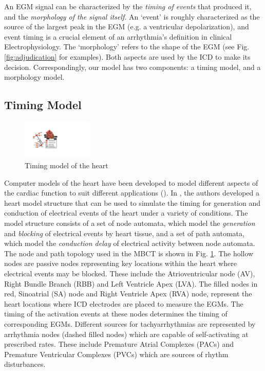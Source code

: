 An \ac{EGM} signal can be characterized by the \emph{timing of events} that produced it, and the \emph{morphology of the signal itself}.
An `event' is roughly characterized as the source of the largest peak in the \ac{EGM} (e.g. a ventricular depolarization), and event timing is a crucial element of an arrhythmia's definition in clinical Electrophysiology.
The `morphology' refers to the shape of the \ac{EGM} (see Fig. \ref{fig:adjudication} for examples).
Both aspects are used by the ICD to make its decision.
Correspondingly, our model has two components: a timing model, and a morphology model.

\subsection{Timing Model}
\begin{figure}[t]
	\centering
	\vspace{-10pt}
	\includegraphics[width=0.3\textwidth]{figs/HM_top.pdf}
	\caption{\small Timing model of the heart}
	\vspace{-10pt}
	\label{fig:HM_top}
\end{figure}
Computer models of the heart have been developed to model different aspects of the cardiac function to suit different applications (\cite{natalia}).
In \cite{VHM_proc}, the authors developed a heart model structure that can be used to simulate the timing for generation and conduction of electrical events of the heart under a variety of conditions.
The model structure consists of a set of node automata, which model the \emph{generation} and \emph{blocking} of electrical events by heart tissue, and a set of path automata, which model the \emph{conduction delay} of electrical activity between node automata.
The node and path topology used in the \ac{MBCT} is shown in Fig. \ref{fig:HM_top}. 
The hollow nodes are passive nodes representing key locations within the heart where electrical events may be blocked. These include the Atrioventricular node (AV), Right Bundle Branch (RBB) and Left Ventricle Apex (LVA). 
The filled nodes in red, Sinoatrial (SA) node and Right Ventricle Apex (RVA) node, represent the heart locations where ICD electrodes are placed to measure the \ac{EGM}s.
The timing of the activation events at these nodes determines the timing of corresponding \ac{EGM}s.
Different sources for tachyarrhythmias are represented by arrhythmia nodes (dashed filled nodes) which are capable of self-activating at prescribed rates. These include Premature Atrial Complexes (PACs) and Premature Ventricular Complexes (PVCs) which are sources of rhythm disturbances.

